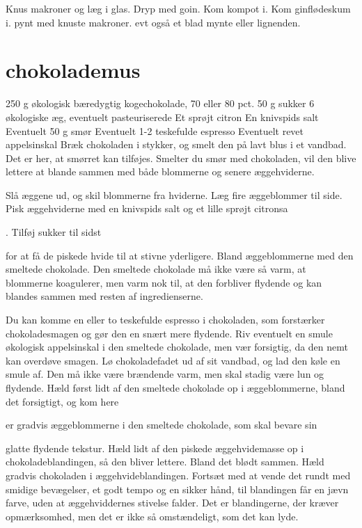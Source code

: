 \documentclass[
]{book}
\begin{document}
Knus makroner og læg i glas. Dryp med goin. Kom kompot i. Kom ginflødeskum i.
pynt med knuste makroner. evt også et blad mynte eller lignenden.

\hypertarget{chokolademus}{%
\section{chokolademus}\label{chokolademus}}

250 g økologisk bæredygtig kogechokolade, 70 eller 80 pct.
50 g sukker 6 økologiske æg, eventuelt pasteuriserede Et sprøjt citron En knivspids salt
Eventuelt 50 g smør Eventuelt 1-2 teskefulde espresso Eventuelt revet appelsinskal Bræk
chokoladen i stykker, og smelt den på lavt blus i et vandbad.
Det er her, at smørret kan tilføjes. Smelter du smør med chokoladen, vil den blive lettere
at blande sammen med både blommerne og senere æggehviderne.

Slå æggene ud, og skil blommerne fra hviderne.
Læg fire æggeblommer til side.
Pisk æggehviderne med en knivspids salt og et lille sprøjt citronsa

. Tilføj sukker til sidst

for at få de piskede hvide til at stivne yderligere.
Bland æggeblommerne med den smeltede chokolade. Den smeltede chokolade må ikke
være så varm, at blommerne koagulerer, men varm nok til, at den forbliver flydende og
kan blandes sammen med resten af ingredienserne.

Du kan komme en eller to teskefulde espresso i chokoladen, som forstærker
chokoladesmagen og gør den en snært mere flydende.
Riv eventuelt en smule økologisk appelsinskal i den smeltede chokolade, men vær
forsigtig, da den nemt kan overdøve smagen.
Lø
chokoladefadet ud af sit vandbad, og lad den køle en smule af. Den må ikke være
brændende varm, men skal stadig være lun og flydende.
Hæld først lidt af den smeltede chokolade op i æggeblommerne, bland det forsigtigt, og
kom here

er gradvis æggeblommerne i den smeltede chokolade, som skal bevare sin

glatte flydende tekstur.
Hæld lidt af den piskede æggehvidemasse op i chokoladeblandingen, så den bliver
lettere.
Bland det blødt sammen. Hæld gradvis chokoladen i æggehvideblandingen. Fortsæt
med at vende det rundt med smidige bevægelser, et godt tempo og en sikker hånd, til
blandingen får en jævn farve, uden at æggehviddernes stivelse falder. Det er
blandingerne, der kræver opmærksomhed, men det er ikke så omstændeligt, som det
kan lyde.
\end{document}
